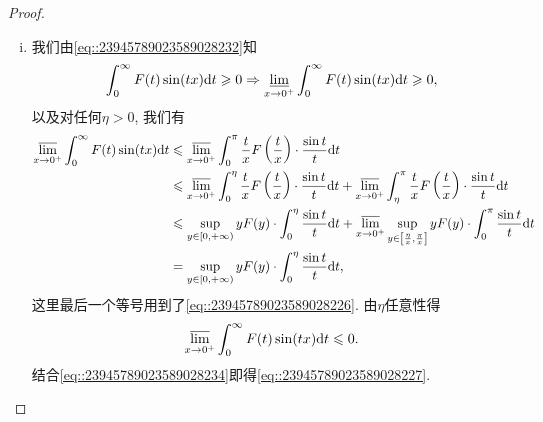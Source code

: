 \documentclass[../../main.tex]{subfiles}%
\begin{document}
\begin{proof}
\begin{enumerate}[(i)]
\item 我们由\eqref{eq::23945789023589028232}知
\begin{align}
\int_0^\infty F(t)\sin(tx)\mathrm{d}t \geqslant 0 \Rightarrow \varliminf_{x \to 0^+} \int_0^\infty F(t)\sin(tx)\mathrm{d}t \geqslant 0, \label{eq::23945789023589028234}
\end{align}
以及对任何$\eta > 0$, 我们有
\begin{align*}
\varlimsup_{x \to 0^+} \int_0^\infty F(t)\sin(tx)\mathrm{d}t &\leqslant \varlimsup_{x \to 0^+} \int_0^\pi \frac{t}{x}F\left(\frac{t}{x}\right) \cdot \frac{\sin t}{t}\mathrm{d}t \\
&\leqslant \varlimsup_{x \to 0^+} \int_0^\eta \frac{t}{x}F\left(\frac{t}{x}\right) \cdot \frac{\sin t}{t}\mathrm{d}t + \varlimsup_{x \to 0^+} \int_\eta^\pi \frac{t}{x}F\left(\frac{t}{x}\right) \cdot \frac{\sin t}{t}\mathrm{d}t \\
&\leqslant \sup_{y \in [0,+\infty)} yF(y) \cdot \int_0^\eta \frac{\sin t}{t}\mathrm{d}t + \varlimsup_{x \to 0^+} \sup_{y \in \left[ \frac{\eta}{x}, \frac{\pi}{x} \right]} yF(y) \cdot \int_0^\pi \frac{\sin t}{t}\mathrm{d}t \\
&= \sup_{y \in [0,+\infty)} yF(y) \cdot \int_0^\eta \frac{\sin t}{t}\mathrm{d}t,
\end{align*}
这里最后一个等号用到了\eqref{eq::23945789023589028226}. 由$\eta$任意性得
\[
\varlimsup_{x \to 0^+} \int_0^\infty F(t)\sin(tx)\mathrm{d}t \leqslant 0.
\]
结合\eqref{eq::23945789023589028234}即得\eqref{eq::23945789023589028227}.
\end{enumerate}

\end{proof}
\end{document}
